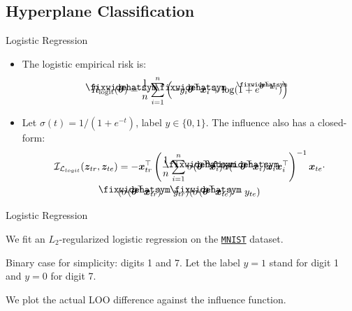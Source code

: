 \documentclass[blue]{beamer}
\newcommand\lowerwidehatsym{%
  \text{\smash{\raisebox{-1.3ex}{%
    $\fixwidehatsym$}}}}
\newcommand\fixwidehat[1]{%
  \mathchoice
    {\accentset{\displaystyle\lowerwidehatsym}{#1}}
    {\accentset{\textstyle\lowerwidehatsym}{#1}}
    {\accentset{\scriptstyle\lowerwidehatsym}{#1}}
    {\accentset{\scriptscriptstyle\lowerwidehatsym}{#1}}
}
\begin{document}
\subsection{Hyperplane Classification}

\begin{frame}{Logistic Regression}
   \begin{itemize}
       \item The logistic empirical risk is:
        \begin{align}\label{logit_R}
        \vspace{-0.2in}
        R_{\text{logit}}(\fixwidehat{\bm{\theta}}) = \frac{1}{n}\sum_{i=1}^n \left(-y_i\fixwidehat{\bm{\theta}}^{\top}\bm{x}_i + \log(1+e^{\fixwidehat{\bm{\theta}}^{\top} \bm{x}_i})\right)
        \vspace{-0.2in}
        \end{align}
        \item
        {
        Let $\sigma(t)=1/(1+e^{-t})$, label $y\in \{0,1\}$. The influence also has a closed-form:
        \begin{align}\label{logit_I_loss}
        \vspace{-0.15in}
        \mathcal{I}_{\mathcal{L}_{logit}}(\bm{z}_{tr}, \bm{z}_{te}) &= -\bm{x}_{tr}^{\top}\left(\frac{1}{n}\sum_{i=1}^n \sigma(\fixwidehat{\bm{\theta}}^{\top}\bm{x}_i)\sigma(-\fixwidehat{\bm{\theta}}^{\top}\bm{x}_i)\bm{x}_i\bm{x}_i^{\top}\right)^{-1} \bm{x}_{te}\cdot\notag\\
        &(\sigma(\fixwidehat{\bm{\theta}}^{\top}\bm{x}_{tr})-y_{tr})(\sigma(\fixwidehat{\bm{\theta}}^{\top}\bm{x}_{te})-y_{te})
        \vspace{-0.15in}
        \end{align}
        }
   \end{itemize}
\end{frame}

\begin{frame}{Logistic Regression}
   \begin{itemize}
       \item
        {
        We fit an $L_2$-regularized logistic regression on the \href{http://yann.lecun.com/exdb/mnist/}{\texttt{MNIST}} dataset. 
        \item Binary case for simplicity: digits 1 and 7. Let the label $y=1$ stand for digit 1 and $y=0$ for digit 7.
        }
        \item We plot the actual LOO difference against the influence function.
   \end{itemize}
\end{frame}
\end{document}
